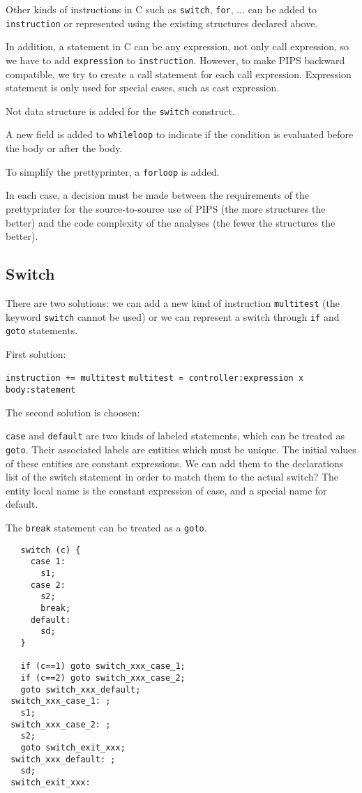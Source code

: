 \documentclass[a4paper]{report}
\begin{document}
Other kinds of instructions in C such as \verb/switch/, \verb/for/,
... can be added to \verb/instruction/ or represented using the
existing structures declared above.

In addition, a statement in C can be any expression, not only call
expression, so we have to add \verb/expression/ to \verb/instruction/.
However, to make PIPS backward compatible, we try to create a call
statement for each call expression. Expression statement is only used
for special cases, such as cast expression.

Not data structure is added for the \verb/switch/ construct.

A new field is added to \verb/whileloop/ to indicate if the condition
is evaluated before the body or after the body.

To simplify the prettyprinter, a \verb/forloop/ is added.

In each case, a decision must be made between the requirements of the
prettyprinter for the source-to-source use of PIPS (the more
structures the better) and the code complexity of the analyses (the
fewer the structures the better).

\subsection{Switch}

There are two solutions: we can add a new kind of instruction
\verb/multitest/ (the keyword \verb/switch/ cannot be used) or we can
represent a switch through \verb/if/ and \verb/goto/ statements.  

First solution: 

\verb/instruction += multitest/
\verb/multitest = controller:expression x body:statement/

The second solution is choosen: 
 
\verb/case/ and \verb/default/ are two kinds of labeled statements, which
can be treated as \verb/goto/. Their
associated labels are entities which must be unique.  The initial values of these
entities are constant expressions. We can add them to the
declarations list of the switch statement in order to match them to the actual
switch? The entity local name is the constant expression of case, and a
special name for default.  

The \verb/break/ statement can be treated as a \verb/goto/.

\begin{lstlisting}
   switch (c) {
     case 1:
       s1;
     case 2: 
       s2;  
       break;
     default: 
       sd;
   }

   if (c==1) goto switch_xxx_case_1;
   if (c==2) goto switch_xxx_case_2;
   goto switch_xxx_default;
 switch_xxx_case_1: ;
   s1;
 switch_xxx_case_2: ;
   s2;
   goto switch_exit_xxx;
 switch_xxx_default: ;
   sd;      
 switch_exit_xxx:
\end{lstlisting}
\end{document}

